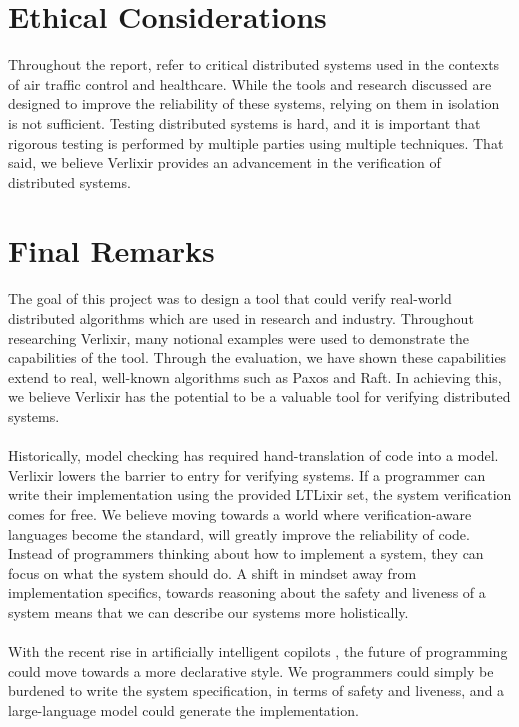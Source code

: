 \section{Ethical Considerations}
Throughout the report, refer to critical distributed systems used in the contexts of air traffic control and healthcare. While the tools and research discussed are designed to improve the reliability of these systems, relying on them in isolation is not sufficient. Testing distributed systems is hard, and it is important that rigorous testing is performed by multiple parties using multiple techniques. That said, we believe Verlixir provides an advancement in the verification of distributed systems.
\section{Final Remarks}
The goal of this project was to design a tool that could verify real-world distributed algorithms which are used in research and industry. Throughout researching Verlixir, many notional examples were used to demonstrate the capabilities of the tool. Through the evaluation, we have shown these capabilities extend to real, well-known algorithms such as Paxos and Raft. In achieving this, we believe Verlixir has the potential to be a valuable tool for verifying distributed systems.
\\ \\
Historically, model checking has required hand-translation of code into a model. Verlixir lowers the barrier to entry for verifying systems. If a programmer can write their implementation using the provided LTLixir set, the system verification comes for free. We believe moving towards a world where verification-aware languages become the standard, will greatly improve the reliability of code. Instead of programmers thinking about how to implement a system, they can focus on what the system should do. A shift in mindset away from implementation specifics, towards reasoning about the safety and liveness of a system means that we can describe our systems more holistically.
\\ \\
With the recent rise in artificially intelligent copilots \cite{attention_is, copilot_asset,safety_ai}, the future of programming could move towards a more declarative style. We programmers could simply be burdened to write the system specification, in terms of safety and liveness, and a large-language model could generate the implementation.